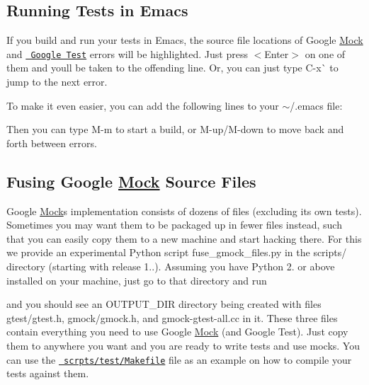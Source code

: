 \subsection*{Running Tests in Emacs}

If you build and run your tests in Emacs, the source file locations of Google \mbox{\hyperlink{class_mock}{Mock}} and \href{../../googletest/}{\texttt{ Google Test}} errors will be highlighted. Just press {\ttfamily $<$Enter$>$} on one of them and you\textquotesingle{}ll be taken to the offending line. Or, you can just type {\ttfamily C-\/x}\`{} to jump to the next error.

To make it even easier, you can add the following lines to your {\ttfamily $\sim$/.emacs} file\+:


\begin{DoxyCode}{0}
\end{DoxyCode}


Then you can type {\ttfamily M-\/m} to start a build, or {\ttfamily M-\/up}/{\ttfamily M-\/down} to move back and forth between errors.

\subsection*{Fusing Google \mbox{\hyperlink{class_mock}{Mock}} Source Files}

Google \mbox{\hyperlink{class_mock}{Mock}}\textquotesingle{}s implementation consists of dozens of files (excluding its own tests). Sometimes you may want them to be packaged up in fewer files instead, such that you can easily copy them to a new machine and start hacking there. For this we provide an experimental Python script {\ttfamily fuse\+\_\+gmock\+\_\+files.\+py} in the {\ttfamily scripts/} directory (starting with release 1..). Assuming you have Python 2. or above installed on your machine, just go to that directory and run 
\begin{DoxyCode}{0}
\end{DoxyCode}


and you should see an {\ttfamily O\+U\+T\+P\+U\+T\+\_\+\+D\+IR} directory being created with files {\ttfamily gtest/gtest.\+h}, {\ttfamily gmock/gmock.\+h}, and {\ttfamily gmock-\/gtest-\/all.\+cc} in it. These three files contain everything you need to use Google \mbox{\hyperlink{class_mock}{Mock}} (and Google Test). Just copy them to anywhere you want and you are ready to write tests and use mocks. You can use the \href{../scripts/test/Makefile}{\texttt{ scrpts/test/\+Makefile}} file as an example on how to compile your tests against them.

